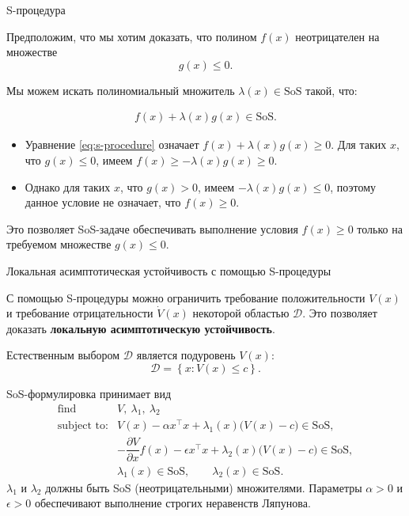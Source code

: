 \documentclass{beamer}
\begin{document}
\begin{frame}{S-процедура}
	\begin{flushleft}
		Предположим, что мы хотим доказать, что полином $f(x)$ неотрицателен на множестве
		\[
		g(x)\leq0.
		\]
		
		Мы можем искать полиномиальный множитель
		$\lambda(x)\in\mathrm{SoS}$ такой, что:
		
		\begin{align}
			\label{eq:s-procedure}
			f(x)+\lambda(x)g(x)\in\mathrm{SoS}.
		\end{align}
		
		
		\begin{itemize}
			\item Уравнение \eqref{eq:s-procedure} означает $
			f(x)+\lambda(x)g(x)\geq0$. Для таких $x$, что $g(x)\leq0$, имеем $f(x)
			\geq
			-\lambda(x)g(x)
			\geq0.$
			
			\item Однако для таких $x$, что $g(x)>0$, имеем $-\lambda(x)g(x)\leq0$, 
			поэтому данное условие не означает, что $f(x)\geq0$.
		\end{itemize}
		
		
		\bigskip
		
		Это позволяет SoS-задаче обеспечивать выполнение условия $f(x)\geq0$
		только на требуемом множестве $g(x)\leq0$.
	\end{flushleft}
\end{frame}




\begin{frame}{Локальная асимптотическая устойчивость с помощью S-процедуры}
	\begin{flushleft}
		С помощью S-процедуры можно ограничить требование положительности
		$V(x)$ и требование отрицательности $\dot V(x)$ некоторой областью $\mathcal{D}$. Это позволяет доказать \textbf{локальную асимптотическую устойчивость}.
		
		\bigskip
		
		Естественным выбором $\mathcal{D}$ является подуровень $V(x)$:
		\[
		\mathcal{D}
		=
		\left\{
		x:V(x)\leq c
		\right\}.
		\]
		
		\bigskip
		
		SoS-формулировка принимает вид
		\[
		\begin{array}{ll}
			\text{find} &
			V,\ \lambda_1,\ \lambda_2
			\\[0.2em]
			\text{subject to:}
			&
			V(x)-\alpha x^\top x
			+\lambda_1(x)\bigl(V(x)-c\bigr)
			\in\mathrm{SoS},
			\\[0.4em]
			&
			-\dfrac{\partial V}{\partial x}f(x)
			-\epsilon x^\top x
			+\lambda_2(x)\bigl(V(x)-c\bigr)
			\in\mathrm{SoS},
			\\[0.4em]
			&
			\lambda_1(x)\in\mathrm{SoS},
			\qquad
			\lambda_2(x)\in\mathrm{SoS}.
		\end{array}
		\]
		{\small
			$\lambda_1$ и $\lambda_2$ должны быть SoS
			(неотрицательными) множителями. Параметры $\alpha>0$
			и $\epsilon>0$ обеспечивают выполнение строгих неравенств Ляпунова.}
	\end{flushleft}
\end{frame}
\end{document}
